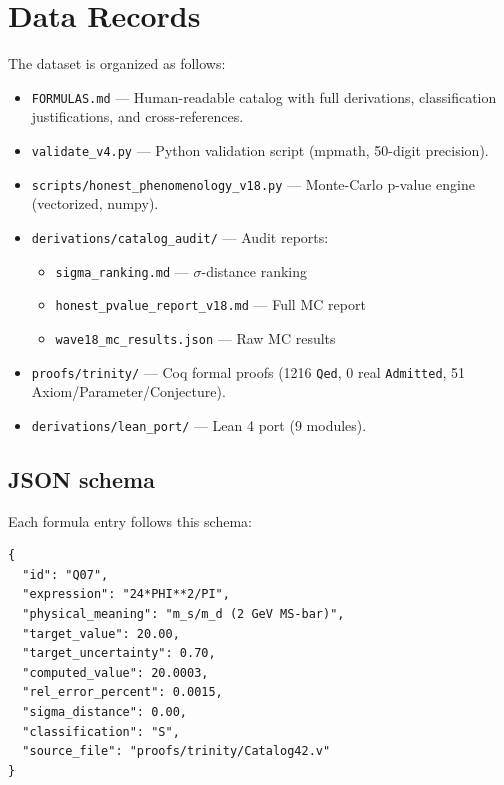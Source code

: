 \documentclass[11pt,a4paper]{article}
\begin{document}
\section{Data Records}
\label{sec:records}

The dataset is organized as follows:

\begin{itemize}
  \item \texttt{FORMULAS.md} — Human-readable catalog with full
    derivations, classification justifications, and cross-references.
  \item \texttt{validate\_v4.py} — Python validation script (mpmath,
    50-digit precision).
  \item \texttt{scripts/honest\_phenomenology\_v18.py} — Monte-Carlo
    p-value engine (vectorized, numpy).
  \item \texttt{derivations/catalog\_audit/} — Audit reports:
    \begin{itemize}
      \item \texttt{sigma\_ranking.md} — $\sigma$-distance ranking
      \item \texttt{honest\_pvalue\_report\_v18.md} — Full MC report
      \item \texttt{wave18\_mc\_results.json} — Raw MC results
    \end{itemize}
  \item \texttt{proofs/trinity/} — Coq formal proofs (1216 \texttt{Qed},
    0 real \texttt{Admitted}, 51 Axiom/Parameter/Conjecture).
  \item \texttt{derivations/lean\_port/} — Lean 4 port (9 modules).
\end{itemize}

\subsection{JSON schema}

Each formula entry follows this schema:
\begin{verbatim}
{
  "id": "Q07",
  "expression": "24*PHI**2/PI",
  "physical_meaning": "m_s/m_d (2 GeV MS-bar)",
  "target_value": 20.00,
  "target_uncertainty": 0.70,
  "computed_value": 20.0003,
  "rel_error_percent": 0.0015,
  "sigma_distance": 0.00,
  "classification": "S",
  "source_file": "proofs/trinity/Catalog42.v"
}
\end{verbatim}
\end{document}
